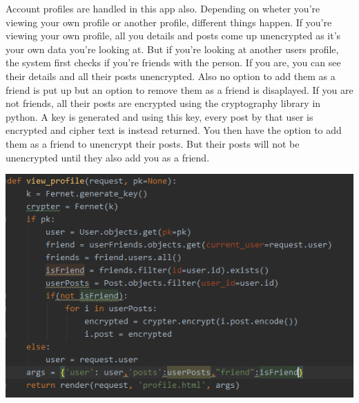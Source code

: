 \documentclass[11pt]{article} %
\begin{document}
Account profiles are handled in this app also. Depending on wheter you're viewing your own profile or another profile, different things happen. If you're viewing your own profile, all you details and posts come up unencrypted as it's your own data you're looking at.
\newline
But if you're looking at another users profile, the system first checks if you're friends with the person. If you are, you can see their details and all their posts unencrypted. Also no option to add them as a friend is put up but an option to remove them as a friend is disaplayed. 
\newline
If you are not friends, all their posts are encrypted using the cryptography library in python. A key is generated and using this key, every post by that user is encrypted and cipher text is instead returned. You then have the option to add them as a friend to unencrypt their posts. But their posts will not be unencrypted until they also add you as a friend.
\begin{center}
\includegraphics{view_profile.png}
\end{center}
\newpage
\end{document}
